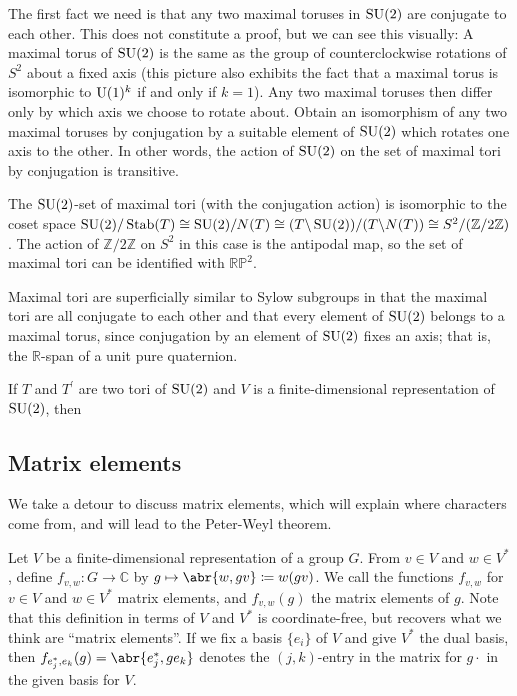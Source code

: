\documentclass[../../rtnotes.tex]{subfiles}
\begin{document}
The first fact we need is that any two maximal toruses in $\operatorname{SU}(2)$ are conjugate to each other. This does not constitute a proof, but we can see this visually:  A maximal torus of $\operatorname{SU}(2)$ is the same as the group of counterclockwise rotations of $S^2$ about a fixed axis (this picture also exhibits the fact that a maximal torus is isomorphic to $\operatorname{U}(1)^k$ if and only if $k = 1$). Any two maximal toruses then differ only by which axis we choose to rotate about. Obtain an isomorphism of any two maximal toruses by conjugation by a suitable element of $\operatorname{SU}(2)$ which rotates one axis to the other. In other words, the action of $\operatorname{SU}(2)$ on the set of maximal tori by conjugation is transitive. 

The $\operatorname{SU}(2)$-set of maximal tori (with the conjugation action) is isomorphic to the coset space $\operatorname{SU}(2)/\operatorname{Stab}(T)\cong \operatorname{SU}(2)/N(T)\cong (T\backslash \operatorname{SU}(2))/(T\backslash N(T))\cong S^2/(\mathbb Z/2\mathbb Z)$. The action of $\mathbb Z/2\mathbb Z$ on $S^2$ in this case is the antipodal map, so the set of maximal tori can be identified with $\mathbb{RP}^2$.

Maximal tori are superficially similar to Sylow subgroups in that the maximal tori are all conjugate to each other and that every element of $\operatorname{SU}(2)$ belongs to a maximal torus, since conjugation by an element of $\operatorname{SU}(2)$ fixes an axis; that is, the $\mathbb R$-span of a unit pure quaternion.

If $T$ and $T^\prime$ are two tori of $\operatorname{SU}(2)$ and $V$ is a finite-dimensional representation of $\operatorname{SU}(2)$, then 

\subsection{Matrix elements}
We take a detour to discuss matrix elements, which will explain where characters come from, and will lead to the Peter-Weyl theorem.

Let $V$ be a finite-dimensional representation of a group $G$. From $v\in V$ and $w\in V^\ast$, define $f_{v,w}\colon G\to \mathbb C$ by $g\mapsto \abr{w,gv}\coloneqq w(gv)$. We call the functions $f_{v,w}$ for $v\in V$ and $w\in V^\ast$ matrix elements, and $f_{v,w}(g)$ the matrix elements of $g$. Note that this definition in terms of $V$ and $V^\ast$ is coordinate-free, but recovers what we think are ``matrix elements''. If we fix a basis $\{e_i\}$ of $V$ and give $V^\ast$ the dual basis, then $f_{e_j^\ast,e_k}(g) = \abr{e_j^\ast,ge_k}$ denotes the $(j,k)$-entry in the matrix for $g\cdot$ in the given basis for $V$. 
\end{document}
